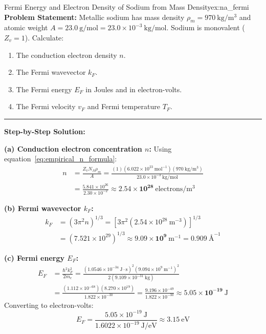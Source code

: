 \documentclass[11pt,a4paper]{article}
\begin{document}
\vspace{0.4cm}

\begin{examplebox}{Fermi Energy and Electron Density of Sodium from Mass Density}{ex:na_fermi}
\textbf{Problem Statement:}
Metallic sodium has mass density $\rho_m = 970\ \mathrm{kg/m^3}$ and atomic weight $A = 23.0\ \mathrm{g/mol} = 23.0 \times 10^{-3}\ \mathrm{kg/mol}$. Sodium is monovalent ($Z_v = 1$). 
Calculate:
\begin{enumerate}[label=(\alph*)]
    \item The conduction electron density $n$.
    \item The Fermi wavevector $k_F$.
    \item The Fermi energy $E_F$ in Joules and in electron-volts.
    \item The Fermi velocity $v_F$ and Fermi temperature $T_F$.
\end{enumerate}

\vspace{0.2cm}\hrule\vspace{0.2cm}
\textbf{Step-by-Step Solution:}

\textbf{(a) Conduction electron concentration $n$:}
Using equation~\eqref{eq:empirical_n_formula}:
\begin{align*}
n &= \frac{Z_v N_A \rho_m}{A} = \frac{(1)(6.022 \times 10^{23}\ \mathrm{mol^{-1}})(970\ \mathrm{kg/m^3})}{23.0 \times 10^{-3}\ \mathrm{kg/mol}} \\
&= \frac{5.841 \times 10^{26}}{2.30 \times 10^{-2}} \approx \mathbf{2.54 \times 10^{28}\ \mathrm{electrons/m^3}}
\end{align*}

\textbf{(b) Fermi wavevector $k_F$:}
\begin{align*}
k_F &= (3\pi^2 n)^{1/3} = \left[ 3\pi^2 (2.54 \times 10^{28}\ \mathrm{m^{-3}}) \right]^{1/3} \\
&= (7.521 \times 10^{29})^{1/3} \approx \mathbf{9.09 \times 10^9\ \mathrm{m^{-1}}} = 0.909\ \text{\AA}^{-1}
\end{align*}

\textbf{(c) Fermi energy $E_F$:}
\begin{align*}
E_F &= \frac{\hbar^2 k_F^2}{2m_e} = \frac{(1.0546 \times 10^{-34}\ \mathrm{J\cdot s})^2 (9.094 \times 10^9\ \mathrm{m^{-1}})^2}{2(9.109 \times 10^{-31}\ \mathrm{kg})} \\
&= \frac{(1.112 \times 10^{-68})(8.270 \times 10^{19})}{1.822 \times 10^{-30}} = \frac{9.196 \times 10^{-49}}{1.822 \times 10^{-30}} \approx \mathbf{5.05 \times 10^{-19}\ \mathrm{J}}
\end{align*}
Converting to electron-volts:
\[
E_F = \frac{5.05 \times 10^{-19}\ \mathrm{J}}{1.6022 \times 10^{-19}\ \mathrm{J/eV}} \approx \mathbf{3.15\ \mathrm{eV}}
\]


\end{examplebox}
\end{document}
